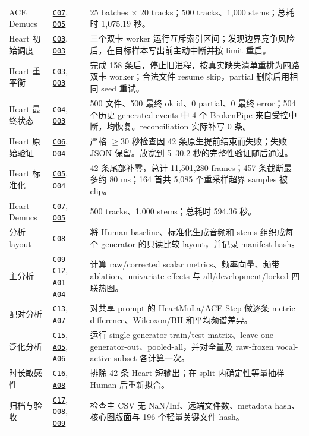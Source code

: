 \documentclass[UTF8,11pt,a4paper,fontset=none]{ctexart}
\newcommand{\coderef}[1]{\hyperlink{code:#1}{\texttt{#1}}}
\newcommand{\outref}[1]{\hyperlink{output:#1}{\texttt{#1}}}
\newcommand{\analysisref}[1]{\hyperlink{analysis:#1}{\texttt{#1}}}
\begin{document}
\begin{longtable}{p{20mm}p{38mm}p{86mm}}
ACE Demucs & \coderef{C07}, \outref{O05} & 25 batches \(\times\) 20 tracks；500 tracks、1,000 stems；总耗时 1,075.19 秒。 \\
Heart 初始调度 & \coderef{C03}, \outref{O03} & 三个双卡 worker 运行互斥索引区间；发现边界竞争风险后，在目标样本写出前主动中断并按 limit 重启。 \\
Heart 重平衡 & \coderef{C03}, \outref{O03} & 完成 158 条后，停止旧进程，按真实缺失清单重排为四路双卡 worker；合法文件 resume skip，partial 删除后用相同 seed 重试。 \\
Heart 最终状态 & \coderef{C04}, \outref{O03} & 500 文件、500 最终 ok id、0 partial、0 最终 error；504 个历史 generated events 中 4 个 BrokenPipe 来自受控中断，均恢复。reconciliation 实际补写 0 条。 \\
Heart 原始验证 & \coderef{C06}, \outref{O04} & 严格 \(\geq30\) 秒检查因 42 条原生提前结束而失败；失败 JSON 保留。放宽到 5--30.2 秒的完整性验证随后通过。 \\
Heart 标准化 & \coderef{C05}, \outref{O04} & 42 条尾部补零，总计 11,501,280 frames；457 条截断最多约 80 ms；164 首共 5,085 个重采样超界 samples 被 clip。 \\
Heart Demucs & \coderef{C07}, \outref{O05} & 500 tracks、1,000 stems；总耗时 594.36 秒。 \\
分析 layout & \coderef{C08} & 将 Human baseline、标准化生成音频和 stems 组织成每个 generator 的只读比较 layout，并记录 manifest hash。 \\
主分析 & \coderef{C09}--\coderef{C12}, \analysisref{A01}--\analysisref{A04} & 计算 raw/corrected scalar metrics、频率向量、频带 ablation、univariate effects 与 all/development/locked 四联热图。 \\
配对分析 & \coderef{C13}, \analysisref{A07} & 对共享 prompt 的 HeartMuLa/ACE-Step 做逐条 metric difference、Wilcoxon/BH 和平均频谱差异。 \\
泛化分析 & \coderef{C15}, \analysisref{A05}, \analysisref{A06} & 运行 single-generator train/test matrix、leave-one-generator-out、pooled-all，并对全量及 raw-frozen vocal-active subset 各计算一次。 \\
时长敏感性 & \coderef{C16}, \analysisref{A08} & 排除 42 条 Heart 短输出；在 split 内确定性等量抽样 Human 后重新拟合。 \\
归档与验收 & \coderef{C17}, \outref{O08}, \outref{O09} & 检查主 CSV 无 NaN/Inf、远端文件数、metadata hash、核心图版面与 196 个轻量关键文件 hash。 \\
\bottomrule
\end{longtable}
\end{document}
